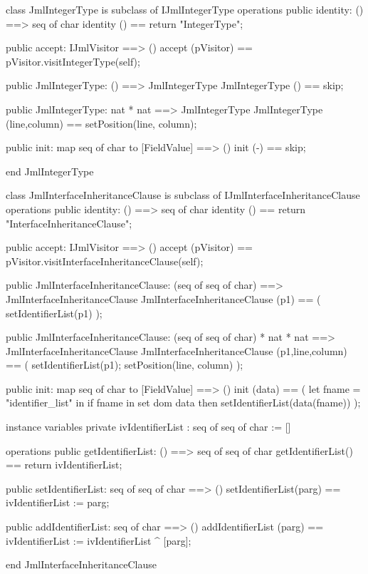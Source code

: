 \begin{vdm_al}
class JmlIntegerType is subclass of IJmlIntegerType
operations
  public identity: () ==> seq of char
  identity () == return "IntegerType";

  public accept: IJmlVisitor ==> ()
  accept (pVisitor) == pVisitor.visitIntegerType(self);

  public JmlIntegerType:
    () ==> JmlIntegerType
  JmlIntegerType () == 
    skip;

  public JmlIntegerType:
    nat *
    nat ==> JmlIntegerType
  JmlIntegerType (line,column) == 
    setPosition(line, column);

  public init: map seq of char to [FieldValue] ==> ()
  init (-) == skip;

end JmlIntegerType
\end{vdm_al}

\begin{vdm_al}
class JmlInterfaceInheritanceClause is subclass of IJmlInterfaceInheritanceClause
operations
  public identity: () ==> seq of char
  identity () == return "InterfaceInheritanceClause";

  public accept: IJmlVisitor ==> ()
  accept (pVisitor) == pVisitor.visitInterfaceInheritanceClause(self);

  public JmlInterfaceInheritanceClause:
    (seq of seq of char) ==> JmlInterfaceInheritanceClause
  JmlInterfaceInheritanceClause (p1) == 
    ( setIdentifierList(p1) );

  public JmlInterfaceInheritanceClause:
    (seq of seq of char) *
    nat *
    nat ==> JmlInterfaceInheritanceClause
  JmlInterfaceInheritanceClause (p1,line,column) == 
    ( setIdentifierList(p1);
      setPosition(line, column) );

  public init: map seq of char to [FieldValue] ==> ()
  init (data) ==
    ( let fname = "identifier_list" in
        if fname in set dom data
        then setIdentifierList(data(fname)) );

instance variables
  private ivIdentifierList : seq of seq of char := []

operations
  public getIdentifierList: () ==> seq of seq of char
  getIdentifierList() == return ivIdentifierList;

  public setIdentifierList: seq of seq of char ==> ()
  setIdentifierList(parg) == ivIdentifierList := parg;

  public addIdentifierList: seq of char ==> ()
  addIdentifierList (parg) == ivIdentifierList := ivIdentifierList ^ [parg];

end JmlInterfaceInheritanceClause
\end{vdm_al}

